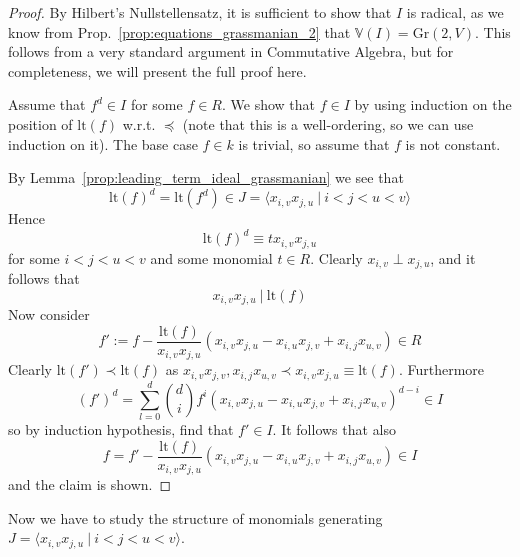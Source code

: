 \documentclass{scrartcl}
\newcommand{\V}{\mathbb{V}}
\newcommand{\Gr}{\mathrm{Gr}}
\newcommand{\divides}{\ | \ }
\theoremstyle{definition}
\begin{document}
\begin{proof}
    By Hilbert's Nullstellensatz, it is sufficient to show that $I$ is radical, as we know from Prop.~\ref{prop:equations_grassmanian_2} that $\V(I) = \Gr(2, V)$.
    This follows from a very standard argument in Commutative Algebra, but for completeness, we will present the full proof here.

    Assume that $f^d \in I$ for some $f \in R$.
    We show that $f \in I$ by using induction on the position of $\mathrm{lt}(f)$ w.r.t. $\preceq$ (note that this is a well-ordering, so we can use induction on it).
    The base case $f \in k$ is trivial, so assume that $f$ is not constant.
    
    By Lemma~\ref{prop:leading_term_ideal_grassmanian} we see that
    \begin{equation*}
        \mathrm{lt}(f)^d = \mathrm{lt}(f^d) \in J = \langle x_{i, v} x_{j, u} \ | \ i < j < u < v \rangle
    \end{equation*}
    Hence
    \begin{equation*}
        \mathrm{lt}(f)^d \equiv t x_{i, v} x_{j, u}
    \end{equation*}
    for some $i < j < u < v$ and some monomial $t \in R$.
    Clearly $x_{i, v} \perp x_{j, u}$, and it follows that
    \begin{equation*}
        x_{i, v} x_{j, u} \divides \mathrm{lt}(f)
    \end{equation*}
    Now consider
    \begin{equation*}
        f' := f - \frac {\mathrm{lt}(f)} {x_{i, v} x_{j, u}} (x_{i, v} x_{j, u} - x_{i, u} x_{j, v} + x_{i, j} x_{u, v}) \in R
    \end{equation*}
    Clearly $\mathrm{lt}(f') \prec \mathrm{lt}(f)$ as $x_{i, v} x_{j, v}, x_{i, j} x_{u, v} \prec x_{i, v} x_{j, u} \equiv \mathrm{lt}(f)$.
    Furthermore
    \begin{equation*}
        (f')^d = \sum_{l = 0}^d {d \choose i} f^i (x_{i, v} x_{j, u} - x_{i, u} x_{j, v} + x_{i, j} x_{u, v})^{d - i} \in I
    \end{equation*}
    so by induction hypothesis, find that $f' \in I$.
    It follows that also
    \begin{equation*}
        f = f'  - \frac {\mathrm{lt}(f)} {x_{i, v} x_{j, u}} (x_{i, v} x_{j, u} - x_{i, u} x_{j, v} + x_{i, j} x_{u, v}) \in I
    \end{equation*}
    and the claim is shown.
\end{proof}
Now we have to study the structure of monomials generating $J = \langle x_{i, v} x_{j, u} \ | \ i < j < u < v \rangle$.
\end{document}
